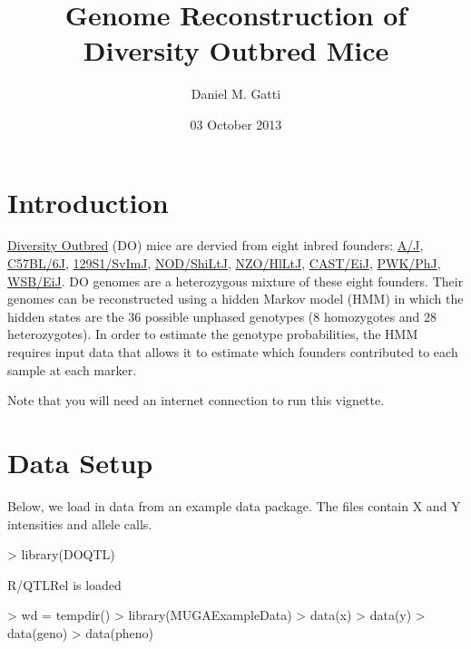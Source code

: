 \documentclass{article}
\begin{document}


\title{Genome Reconstruction of Diversity Outbred Mice}
\author{Daniel M. Gatti}
\date{03 October 2013}
\maketitle

\section{Introduction}

\href{http://jaxmice.jax.org/strain/009376.html}{Diversity Outbred} (DO) mice are dervied from eight inbred founders: 
  \href{http://jaxmice.jax.org/strain/000646.html}{A/J},
  \href{http://jaxmice.jax.org/strain/000664.html}{C57BL/6J},
  \href{http://jaxmice.jax.org/strain/002448.html}{129S1/SvImJ},
  \href{http://jaxmice.jax.org/strain/001976.html}{NOD/ShiLtJ},
  \href{http://jaxmice.jax.org/strain/002105.html}{NZO/HlLtJ},
  \href{http://jaxmice.jax.org/strain/000928.html}{CAST/EiJ},
  \href{http://jaxmice.jax.org/strain/003715.html}{PWK/PhJ},
  \href{http://jaxmice.jax.org/strain/001145.html}{WSB/EiJ}.
DO genomes are a heterozygous mixture of these eight founders. Their genomes can be 
reconstructed using a hidden Markov model (HMM) in which the hidden states are the 36 possible 
unphased genotypes (8 homozygotes and 28 heterozygotes).  In order to estimate the genotype
probabilities, the HMM requires input data that allows it to estimate which founders contributed
to each sample at each marker.

Note that you will need an internet connection to run this vignette.

\section{Data Setup}

Below, we load in data from an example data package. The files contain X and Y intensities and allele calls.

\begin{Schunk}
\begin{Sinput}
> library(DOQTL)
\end{Sinput}
\begin{Soutput}
R/QTLRel is loaded
\end{Soutput}
\begin{Sinput}
> wd = tempdir()
> library(MUGAExampleData)
> data(x)
> data(y)
> data(geno)
> data(pheno)
\end{Sinput}
\end{Schunk}
\end{document}
